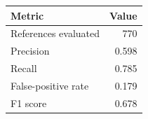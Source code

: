 \begin{tabular}{lr}
\toprule
Metric & Value \\
\midrule
References evaluated & 770 \\
Precision & 0.598 \\
Recall & 0.785 \\
False-positive rate & 0.179 \\
F1 score & 0.678 \\
\bottomrule
\end{tabular}
